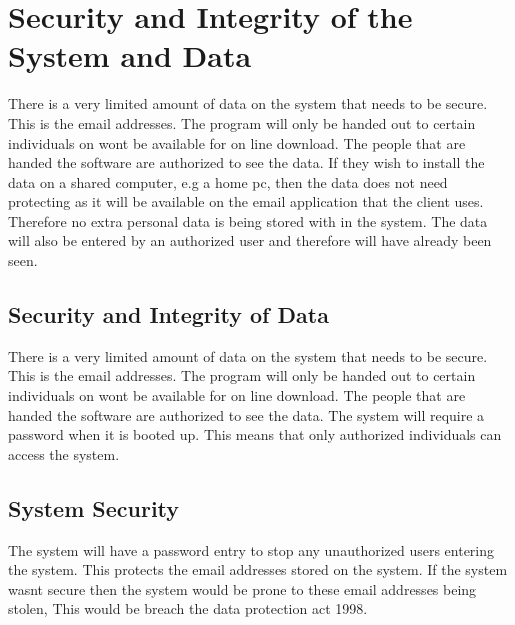 \section{Security and Integrity of the System and Data}
There is a very limited amount of data on the system that needs to be secure. This is the email addresses. The program will only be handed out to certain individuals on wont be available for on line download. The people that are handed the software are authorized to see the data. If they wish to install the data on a shared computer, e.g a home pc, then the data does not need protecting as it will be available on the email application that the client uses. Therefore no extra personal data is being stored with in the system. The data will also be entered by an authorized user and therefore will have already been seen. 

\subsection{Security and Integrity of Data}
There is a very limited amount of data on the system that needs to be secure. This is the email addresses. The program will only be handed out to certain individuals on wont be available for on line download. The people that are handed the software are authorized to see the data. The system will require a password when it is booted up. This means that only authorized individuals can access the system.  

\subsection{System Security}
The system will have a password entry to stop any unauthorized users entering the system. This protects the email addresses stored on the system. If the system wasnt secure then the system would be prone to these email addresses being stolen, This would be breach the data protection act 1998. 
